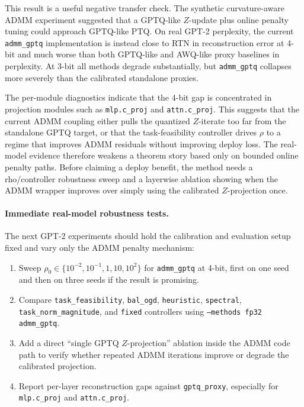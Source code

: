 \documentclass[11pt]{article}
\begin{document}
This result is a useful negative transfer check.  The synthetic curvature-aware
ADMM experiment suggested that a GPTQ-like \(Z\)-update plus online penalty
tuning could approach GPTQ-like PTQ.  On real GPT-2 perplexity, the current
\texttt{admm\_gptq} implementation is instead close to RTN in reconstruction
error at 4-bit and much worse than both GPTQ-like and AWQ-like proxy baselines
in perplexity.  At 3-bit all methods degrade substantially, but
\texttt{admm\_gptq} collapses more severely than the calibrated standalone
proxies.

The per-module diagnostics indicate that the 4-bit gap is concentrated in
projection modules such as \texttt{mlp.c\_proj} and \texttt{attn.c\_proj}.
This suggests that the current ADMM coupling either pulls the quantized
\(Z\)-iterate too far from the standalone GPTQ target, or that the
task-feasibility controller drives \(\rho\) to a regime that improves ADMM
residuals without improving deploy loss.  The real-model evidence therefore
weakens a theorem story based only on bounded online penalty paths.  Before
claiming a deploy benefit, the method needs a rho/controller robustness sweep
and a layerwise ablation showing when the ADMM wrapper improves over simply
using the calibrated \(Z\)-projection once.

\paragraph{Immediate real-model robustness tests.}
The next GPT-2 experiments should hold the calibration and evaluation setup
fixed and vary only the ADMM penalty mechanism:
\begin{enumerate}
    \item Sweep \(\rho_0\in\{10^{-2},10^{-1},1,10,10^2\}\) for
          \texttt{admm\_gptq} at 4-bit, first on one seed and then on three
          seeds if the result is promising.
    \item Compare \texttt{task\_feasibility}, \texttt{bal\_ogd},
          \texttt{heuristic}, \texttt{spectral},
          \texttt{task\_norm\_magnitude}, and \texttt{fixed} controllers using
          \texttt{--methods fp32 admm\_gptq}.
    \item Add a direct ``single GPTQ \(Z\)-projection'' ablation inside the
          ADMM code path to verify whether repeated ADMM iterations improve or
          degrade the calibrated projection.
    \item Report per-layer reconstruction gaps against \texttt{gptq\_proxy},
          especially for \texttt{mlp.c\_proj} and \texttt{attn.c\_proj}.
\end{enumerate}
\end{document}
